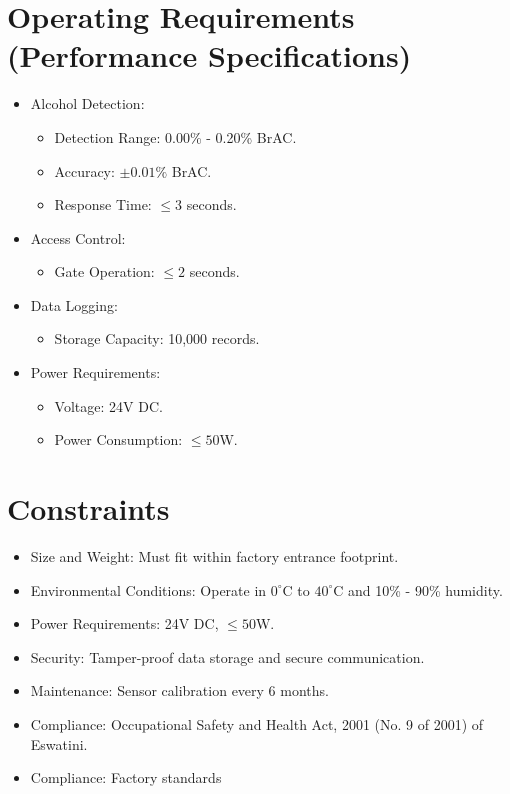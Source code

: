 \documentclass[12pt]{article}
\begin{document}
    \section{Operating Requirements (Performance Specifications)}
    \label{sec:operating_requirements}
    \begin{itemize}
        \item Alcohol Detection:
        \begin{itemize}
            \item Detection Range: 0.00\% - 0.20\% BrAC.
            \item Accuracy: $\pm 0.01\%$ BrAC.
            \item Response Time: $\leq 3$ seconds.
        \end{itemize}
        \item Access Control:
        \begin{itemize}
            \item Gate Operation: $\leq 2$ seconds.
        \end{itemize}
        \item Data Logging:
        \begin{itemize}
            \item Storage Capacity: 10,000 records.
        \end{itemize}
        \item Power Requirements:
        \begin{itemize}
            \item Voltage: 24V DC.
            \item Power Consumption: $\leq 50$W.
        \end{itemize}
    \end{itemize}

    \section{Constraints}
    \label{sec:constraints}
    \begin{itemize}
        \item Size and Weight: Must fit within factory entrance footprint.
        \item Environmental Conditions: Operate in $0^\circ$C to $40^\circ$C and 10\% - 90\% humidity.
        \item Power Requirements: 24V DC, $\leq 50$W.
        \item Security: Tamper-proof data storage and secure communication.
        \item Maintenance: Sensor calibration every 6 months.
        \item Compliance: Occupational Safety and Health Act, 2001 (No. 9 of 2001) of Eswatini.
        \item Compliance: Factory standards\cite{industrial_safety}
    \end{itemize}
\end{document}
